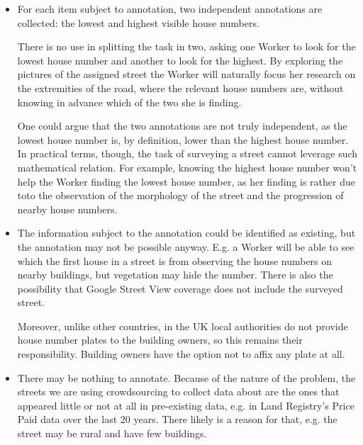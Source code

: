 \begin{itemize}
        
    \item For each item subject to annotation, two independent annotations are collected: the lowest and highest visible house numbers. 
        
        There is no use in splitting the task in two, asking one Worker to look for the lowest house number and another to look for the highest. By exploring the pictures of the assigned street the Worker will naturally focus her research on the extremities of the road, where the relevant house numbers are, without knowing in advance which of the two she is finding.
        
        One could argue that the two annotations are not truly independent, as the lowest house number is, by definition, lower than the highest house number. In practical terms, though, the task of surveying a street cannot leverage such mathematical relation. For example, knowing the highest house number won't help the Worker finding the lowest house number, as her finding is rather due toto the observation of the morphology of the street and the progression of nearby house numbers. 
        
    \item The information subject to the annotation could be identified as existing, but the annotation may not be possible anyway. E.g. a Worker will be able to see which the first house in a street is from observing the house numbers on nearby buildings, but vegetation may hide the number. There is also the possibility that Google Street View coverage does not include the surveyed street.
        
        Moreover, unlike other countries, in the UK local authorities do not provide house number plates to the building owners, so this remains their responsibility. Building owners have the option not to affix any plate at all. 
        
    \item There may be nothing to annotate. Because of the nature of the problem, the streets we are using crowdsourcing to collect data about are the ones that appeared little or not at all in pre-existing data, e.g. in Land Registry's Price Paid data over the last 20 years. There likely is a reason for that, e.g. the street may be rural and have few buildings. 
        
\end{itemize}
    
